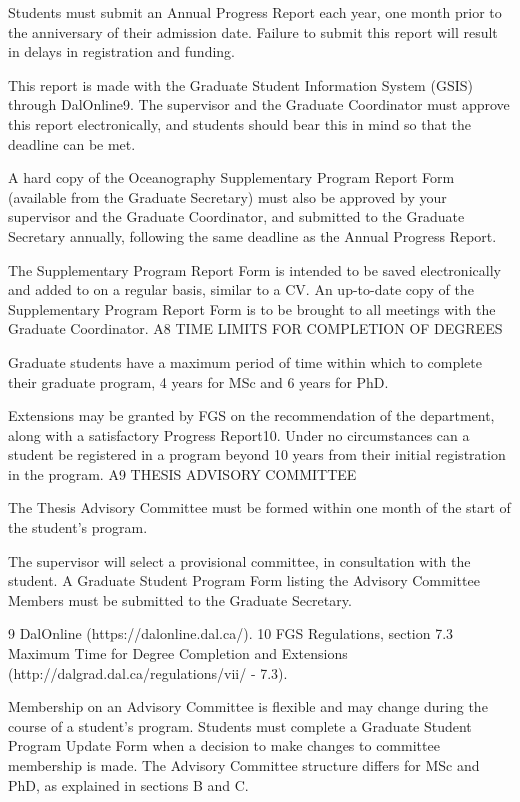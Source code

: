 Students must submit an Annual Progress Report each year, one month prior to the anniversary of their admission date. Failure to submit this report will result in delays in registration and funding.

This report is made with the Graduate Student Information System (GSIS) through DalOnline9. The supervisor and the Graduate Coordinator must approve this report electronically, and students should bear this in mind so that the deadline can be met.

A hard copy of the Oceanography Supplementary Program Report Form (available from the Graduate Secretary) must also be approved by your supervisor and the Graduate Coordinator, and submitted to the Graduate Secretary annually, following the same deadline as the Annual Progress Report.

The Supplementary Program Report Form is intended to be saved electronically and added to on a regular basis, similar to a CV. An up-to-date copy of the Supplementary Program Report Form is to be brought to all meetings with the Graduate Coordinator.
A8	TIME LIMITS FOR COMPLETION OF DEGREES

Graduate students have a maximum period of time within which to complete their graduate program, 4 years for MSc and 6 years for PhD.

Extensions may be granted by FGS on the recommendation of the department, along with a satisfactory Progress Report10. Under no circumstances can a student be registered in a program beyond 10 years from their initial registration in the program.
A9	THESIS ADVISORY COMMITTEE

The Thesis Advisory Committee must be formed within one month of the start of the student’s program.

The supervisor will select a provisional committee, in consultation with the student. A Graduate Student Program Form listing the Advisory Committee Members must be submitted to the Graduate Secretary.


9 DalOnline (https://dalonline.dal.ca/).
10 FGS Regulations, section 7.3 Maximum Time for Degree Completion and Extensions (http://dalgrad.dal.ca/regulations/vii/ - 7.3).
 

Membership on an Advisory Committee is flexible and may change during the course of a student’s program. Students must complete a Graduate Student Program Update Form when a decision to make changes to committee membership is made. The Advisory Committee structure differs for MSc and PhD, as explained in sections B and C.

